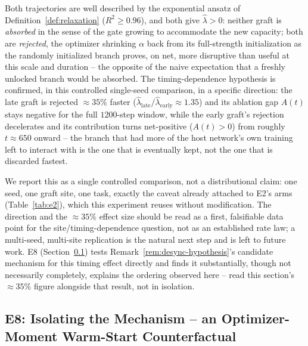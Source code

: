 \documentclass[11pt,a4paper]{article}
\begin{document}
Both trajectories are well described by the exponential ansatz of Definition~\ref{def:relaxation}
($R^2 \geq 0.96$), and both give $\hat\lambda > 0$: neither graft is \emph{absorbed} in the sense
of the gate growing to accommodate the new capacity; both are \emph{rejected}, the optimizer
shrinking $\alpha$ back from its full-strength initialization as the randomly initialized branch
proves, on net, more disruptive than useful at this scale and duration -- the opposite of the naive
expectation that a freshly unlocked branch would be absorbed. The timing-dependence hypothesis is
confirmed, in this controlled single-seed comparison, in a specific direction: the late graft is
rejected $\approx 35\%$ faster ($\hat\lambda_{\mathrm{late}} / \hat\lambda_{\mathrm{early}} \approx 1.35$)
and its ablation gap $A(t)$ stays negative for the full $1200$-step window, while the early graft's
rejection decelerates and its contribution turns net-positive ($A(t) > 0$) from roughly $t \approx
650$ onward -- the branch that had more of the host network's own training left to interact with is
the one that is eventually kept, not the one that is discarded fastest.

We report this as a single controlled comparison, not a distributional claim: one seed, one graft
site, one task, exactly the caveat already attached to E2's arms (Table~\ref{tab:e2}), which this
experiment reuses without modification. The direction and the $\approx 35\%$ effect size should be
read as a first, falsifiable data point for the site/timing-dependence question, not as an
established rate law; a multi-seed, multi-site replication is the natural next step and is left to
future work. E8 (Section~\ref{sec:e8}) tests Remark~\ref{rem:desync-hypothesis}'s candidate
mechanism for this timing effect directly and finds it substantially, though not necessarily
completely, explains the ordering observed here -- read this section's $\approx 35\%$ figure
alongside that result, not in isolation.

\subsection{E8: Isolating the Mechanism -- an Optimizer-Moment Warm-Start Counterfactual}
\label{sec:e8}
\end{document}
